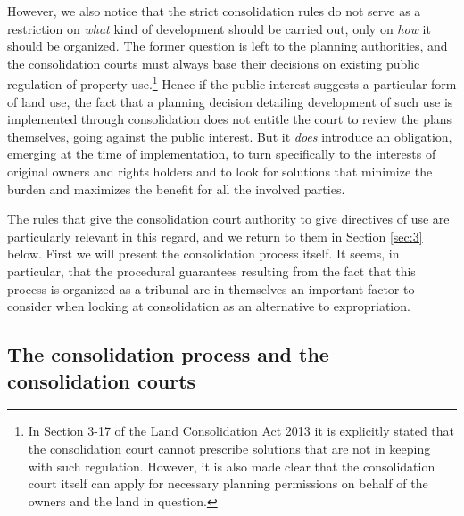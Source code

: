 
However, we also notice that the strict consolidation rules do not serve as a restriction on \emph{what} kind of development should be carried out, only on \emph{how} it should be organized. The former question is left to the planning authorities, and the consolidation courts must always base their decisions on existing public regulation of property use.\footnote{In Section 3-17 of the Land Consolidation Act 2013 it is explicitly stated that the consolidation court cannot prescribe solutions that are not in keeping with such regulation. However, it is also made clear that the consolidation court itself can apply for necessary planning permissions on behalf of the owners and the land in question.} Hence if the public interest suggests a particular form of land use, the fact that a planning decision detailing development of such use is implemented through consolidation does not entitle the court to review the plans themselves, going against the public interest. But it \emph{does} introduce an obligation, emerging at the time of implementation, to turn specifically to the interests of original owners and rights holders and to look for solutions that minimize the burden and maximizes the benefit for all the involved parties.

The rules that give the consolidation court authority to give directives of use are particularly relevant in this regard, and we return to them in Section \ref{sec:3} below. First we will present the consolidation process itself. It seems, in particular, that the procedural guarantees resulting from the fact that this process is organized as a tribunal are in themselves an important factor to consider when looking at consolidation as an alternative to expropriation.

\subsection{The consolidation process and the consolidation courts}\label{subsec:21}

